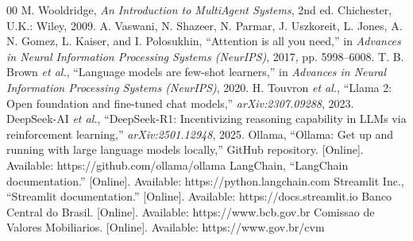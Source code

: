 \documentclass[conference]{IEEEtran}
\begin{document}
\begin{thebibliography}{00}
 M. Wooldridge, \emph{An Introduction to MultiAgent Systems}, 2nd ed. Chichester, U.K.: Wiley, 2009.
 A. Vaswani, N. Shazeer, N. Parmar, J. Uszkoreit, L. Jones, A. N. Gomez, L. Kaiser, and I. Polosukhin, ``Attention is all you need,'' in \emph{Advances in Neural Information Processing Systems (NeurIPS)}, 2017, pp. 5998--6008.
 T. B. Brown \emph{et al.}, ``Language models are few-shot learners,'' in \emph{Advances in Neural Information Processing Systems (NeurIPS)}, 2020.
 H. Touvron \emph{et al.}, ``Llama 2: Open foundation and fine-tuned chat models,'' \emph{arXiv:2307.09288}, 2023.
 DeepSeek-AI \emph{et al.}, ``DeepSeek-R1: Incentivizing reasoning capability in LLMs via reinforcement learning,'' \emph{arXiv:2501.12948}, 2025.
 Ollama, ``Ollama: Get up and running with large language models locally,'' GitHub repository. [Online]. Available: https://github.com/ollama/ollama
 LangChain, ``LangChain documentation.'' [Online]. Available: https://python.langchain.com
 Streamlit Inc., ``Streamlit documentation.'' [Online]. Available: https://docs.streamlit.io
 Banco Central do Brasil. [Online]. Available: https://www.bcb.gov.br
 Comissao de Valores Mobiliarios. [Online]. Available: https://www.gov.br/cvm
\end{thebibliography}
\end{document}
